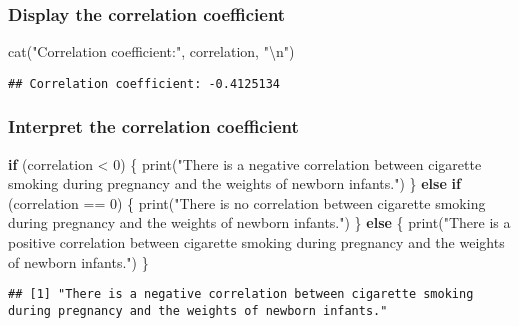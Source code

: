 \documentclass[
]{article}
\newenvironment{Shaded}{\begin{snugshade}}{\end{snugshade}}
\newcommand{\ControlFlowTok}[1]{\textcolor[rgb]{0.13,0.29,0.53}{\textbf{#1}}}
\newcommand{\DecValTok}[1]{\textcolor[rgb]{0.00,0.00,0.81}{#1}}
\newcommand{\FunctionTok}[1]{\textcolor[rgb]{0.00,0.00,0.00}{#1}}
\newcommand{\NormalTok}[1]{#1}
\newcommand{\SpecialCharTok}[1]{\textcolor[rgb]{0.00,0.00,0.00}{#1}}
\newcommand{\StringTok}[1]{\textcolor[rgb]{0.31,0.60,0.02}{#1}}
\begin{document}
\hypertarget{display-the-correlation-coefficient}{%
\subsubsection{Display the correlation
coefficient}\label{display-the-correlation-coefficient}}

\begin{Shaded}
\begin{Highlighting}[]
\FunctionTok{cat}\NormalTok{(}\StringTok{"Correlation coefficient:"}\NormalTok{, correlation, }\StringTok{"}\SpecialCharTok{\textbackslash{}n}\StringTok{"}\NormalTok{)}
\end{Highlighting}
\end{Shaded}

\begin{verbatim}
## Correlation coefficient: -0.4125134
\end{verbatim}

\hypertarget{interpret-the-correlation-coefficient}{%
\subsubsection{Interpret the correlation
coefficient}\label{interpret-the-correlation-coefficient}}

\begin{Shaded}
\begin{Highlighting}[]
\ControlFlowTok{if}\NormalTok{ (correlation }\SpecialCharTok{\textless{}} \DecValTok{0}\NormalTok{) \{}
  \FunctionTok{print}\NormalTok{(}\StringTok{"There is a negative correlation between cigarette smoking during pregnancy and the weights of newborn infants."}\NormalTok{)}
\NormalTok{\} }\ControlFlowTok{else} \ControlFlowTok{if}\NormalTok{ (correlation }\SpecialCharTok{==} \DecValTok{0}\NormalTok{) \{}
  \FunctionTok{print}\NormalTok{(}\StringTok{"There is no correlation between cigarette smoking during pregnancy and the weights of newborn infants."}\NormalTok{)}
\NormalTok{\} }\ControlFlowTok{else}\NormalTok{ \{}
  \FunctionTok{print}\NormalTok{(}\StringTok{"There is a positive correlation between cigarette smoking during pregnancy and the weights of newborn infants."}\NormalTok{)}
\NormalTok{\}}
\end{Highlighting}
\end{Shaded}

\begin{verbatim}
## [1] "There is a negative correlation between cigarette smoking during pregnancy and the weights of newborn infants."
\end{verbatim}
\end{document}
